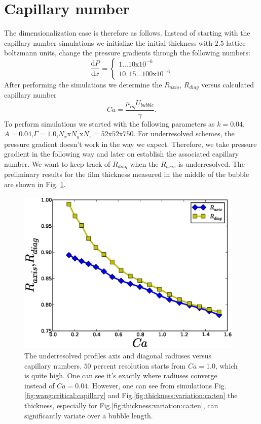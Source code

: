 \documentclass{article}
\begin{document}
\section{Capillary number}
 The
dimensionalization case is therefore as follows. Instead of starting with the capillary number
simulations we initialize the initial thickness with $2.5$ lattice boltzmann units, change the
pressure gradients through the following numbers:
\begin{equation}
\frac{\mathrm{d}P}{\mathrm{d}x}=
\begin{cases}
1\dots10\mathrm{x}10^{-6}\\
10,15\dots 100 \mathrm{x}10^{-6}
\end{cases}
\end{equation}
After performing the simulations we determine the $R_{axis}$, $R_{diag}$ versus calculated
capillary number
\begin{equation}
Ca=\frac{\mu_{liq} U_{bubble}}{\gamma}.
\end{equation}
To perform simulations we
started with the following parameters as
$k=0.04$,$A=0.04$,$\Gamma=1.0$,$N_x\mathrm{x}N_y\mathrm{x}N_z=52\mathrm{x}52\mathrm{x}750$.
For underresolved schemes, the pressure gradient doesn't work in the way we expect. Therefore, we
take pressure gradient in the following way and later on establish the associated capillary number.
We want to keep track of $R_{diag}$ when the $R_{axis}$ is underresolved. The preliminary results
for the film thickness measured in the middle of the bubble are shown in Fig.
\ref{fig:underresolved:capillaries}. 
\begin{figure}
\includegraphics[width=0.97\textwidth]{Figures/underresolved_capillaries.eps}
\caption{The underresolved profiles axis and diagonal radiuses versus capillary numbers. $50$
percent resolution starts from $Ca=1.0$, which is quite high. One can see it's exactly where
radiuses converge instead of $Ca=0.04$. However, one can see from simulations Fig.
\ref{fig:wang:critical:capillary} and Fig.\ref{fig:thickness:variation:ca:ten} the thickness,
especially for Fig.\ref{fig:thickness:variation:ca:ten}, can significantly variate over a bubble
length. \label{fig:underresolved:capillaries}}
\end{figure}
\end{document}
